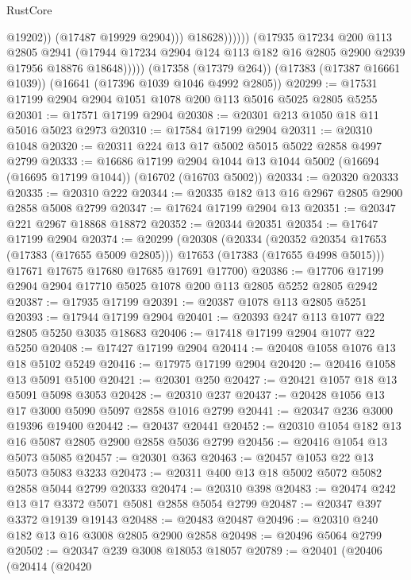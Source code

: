 \begin{lexlean}{RustCore}
\begin{coremodule}
                              @19202))
                          (@17487 @19929 @2904)))
                      @18628))))))
          (@17935
            @17234
            @200
            @113
            @2805
            @2941
            (@17944 @17234 @2904 @124 @113 @182 @16 @2805 @2900 @2939 @17956 @18876 @18648)))))
    (@17358 (@17379 @264))
    (@17383 (@17387 @16661 @1039))
    (@16641 (@17396 @1039 @1046 @4992 @2805))
@20299 := @17531 @17199 @2904 @2904 @1051 @1078 @200 @113 @5016 @5025 @2805 @5255
@20301 := @17571 @17199 @2904
@20308 := @20301 @213 @1050 @18 @11 @5016 @5023 @2973
@20310 := @17584 @17199 @2904
@20311 := @20310 @1048
@20320 := @20311 @224 @13 @17 @5002 @5015 @5022 @2858 @4997 @2799
@20333 := @16686
    @17199
    @2904
    @1044
    @13
    @1044
    @5002
    (@16694 (@16695 @17199 @1044))
    (@16702 (@16703 @5002))
@20334 := @20320 @20333
@20335 := @20310 @222
@20344 := @20335 @182 @13 @16 @2967 @2805 @2900 @2858 @5008 @2799
@20347 := @17624 @17199 @2904 @13
@20351 := @20347 @221 @2967 @18868 @18872
@20352 := @20344 @20351
@20354 := @17647 @17199 @2904
@20374 := @20299
    (@20308
      (@20334
        (@20352 @20354 @17653 (@17383 (@17655 @5009 @2805)))
        @17653
        (@17383 (@17655 @4998 @5015)))
      @17671
      @17675
      @17680
      @17685
      @17691
      @17700)
@20386 := @17706 @17199 @2904 @2904 @17710 @5025 @1078 @200 @113 @2805 @5252 @2805 @2942
@20387 := @17935 @17199
@20391 := @20387 @1078 @113 @2805 @5251
@20393 := @17944 @17199 @2904
@20401 := @20393 @247 @113 @1077 @22 @2805 @5250 @3035 @18683
@20406 := @17418 @17199 @2904 @1077 @22 @5250
@20408 := @17427 @17199 @2904
@20414 := @20408 @1058 @1076 @13 @18 @5102 @5249
@20416 := @17975 @17199 @2904
@20420 := @20416 @1058 @13 @5091 @5100
@20421 := @20301 @250
@20427 := @20421 @1057 @18 @13 @5091 @5098 @3053
@20428 := @20310 @237
@20437 := @20428 @1056 @13 @17 @3000 @5090 @5097 @2858 @1016 @2799
@20441 := @20347 @236 @3000 @19396 @19400
@20442 := @20437 @20441
@20452 := @20310 @1054 @182 @13 @16 @5087 @2805 @2900 @2858 @5036 @2799
@20456 := @20416 @1054 @13 @5073 @5085
@20457 := @20301 @363
@20463 := @20457 @1053 @22 @13 @5073 @5083 @3233
@20473 := @20311 @400 @13 @18 @5002 @5072 @5082 @2858 @5044 @2799 @20333
@20474 := @20310 @398
@20483 := @20474 @242 @13 @17 @3372 @5071 @5081 @2858 @5054 @2799
@20487 := @20347 @397 @3372 @19139 @19143
@20488 := @20483 @20487
@20496 := @20310 @240 @182 @13 @16 @3008 @2805 @2900 @2858
@20498 := @20496 @5064 @2799
@20502 := @20347 @239 @3008 @18053 @18057
@20789 := @20401
    (@20406
      (@20414
        (@20420

\end{coremodule}
\end{lexlean}
